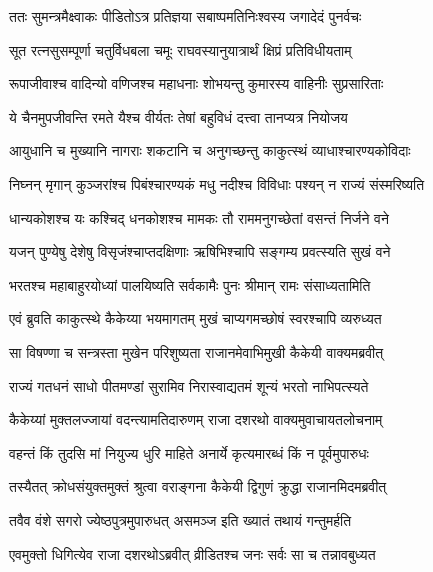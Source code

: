 
\twolineshloka
{ततः सुमन्त्रमैक्ष्वाकः पीडितोऽत्र प्रतिज्ञया}
{सबाष्पमतिनिःश्वस्य जगादेदं पुनर्वचः} %

\twolineshloka
{सूत रत्नसुसम्पूर्णा चतुर्विधबला चमूः}
{राघवस्यानुयात्रार्थं क्षिप्रं प्रतिविधीयताम्} %

\twolineshloka
{रूपाजीवाश्च वादिन्यो वणिजश्च महाधनाः}
{शोभयन्तु कुमारस्य वाहिनीः सुप्रसारिताः} %

\twolineshloka
{ये चैनमुपजीवन्ति रमते यैश्च वीर्यतः}
{तेषां बहुविधं दत्त्वा तानप्यत्र नियोजय} %

\twolineshloka
{आयुधानि च मुख्यानि नागराः शकटानि च}
{अनुगच्छन्तु काकुत्स्थं व्याधाश्चारण्यकोविदाः} %

\twolineshloka
{निघ्नन् मृगान् कुञ्जरांश्च पिबंश्चारण्यकं मधु}
{नदीश्च विविधाः पश्यन् न राज्यं संस्मरिष्यति} %

\twolineshloka
{धान्यकोशश्च यः कश्चिद् धनकोशश्च मामकः}
{तौ राममनुगच्छेतां वसन्तं निर्जने वने} %

\twolineshloka
{यजन् पुण्येषु देशेषु विसृजंश्चाप्तदक्षिणाः}
{ऋषिभिश्चापि सङ्गम्य प्रवत्स्यति सुखं वने} %

\twolineshloka
{भरतश्च महाबाहुरयोध्यां पालयिष्यति}
{सर्वकामैः पुनः श्रीमान् रामः संसाध्यतामिति} %

\twolineshloka
{एवं ब्रुवति काकुत्स्थे कैकेय्या भयमागतम्}
{मुखं चाप्यगमच्छोषं स्वरश्चापि व्यरुध्यत} %

\twolineshloka
{सा विषण्णा च सन्त्रस्ता मुखेन परिशुष्यता}
{राजानमेवाभिमुखी कैकेयी वाक्यमब्रवीत्} %

\twolineshloka
{राज्यं गतधनं साधो पीतमण्डां सुरामिव}
{निरास्वाद्यतमं शून्यं भरतो नाभिपत्स्यते} %

\twolineshloka
{कैकेय्यां मुक्तलज्जायां वदन्त्यामतिदारुणम्}
{राजा दशरथो वाक्यमुवाचायतलोचनाम्} %

\twolineshloka
{वहन्तं किं तुदसि मां नियुज्य धुरि माहिते}
{अनार्ये कृत्यमारब्धं किं न पूर्वमुपारुधः} %

\twolineshloka
{तस्यैतत् क्रोधसंयुक्तमुक्तं श्रुत्वा वराङ्गना}
{कैकेयी द्विगुणं क्रुद्धा राजानमिदमब्रवीत्} %

\twolineshloka
{तवैव वंशे सगरो ज्येष्ठपुत्रमुपारुधत्}
{असमञ्ज इति ख्यातं तथायं गन्तुमर्हति} %

\twolineshloka
{एवमुक्तो धिगित्येव राजा दशरथोऽब्रवीत्}
{व्रीडितश्च जनः सर्वः सा च तन्नावबुध्यत} %

